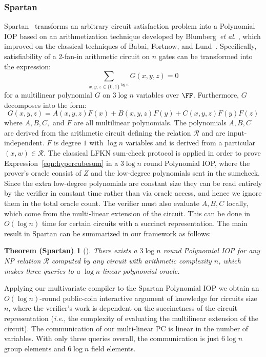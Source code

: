 
\subsubsection{Spartan}
\textsf{Spartan}~\cite{Spartan} transforms an arbitrary circuit satisfaction problem into a Polynomial IOP based on an arithmetization technique developed by Blumberg~\emph{et al.} \cite{EPRINT:BTVW14}, which improved on the classical techniques of Babai, Fortnow, and Lund~\cite{BFL}. Specifically, satisfiability of a 2-fan-in arithmetic circuit on $n$ gates can be transformed into the expression: 
\begin{equation}\label{eqn:hypercubesum}
\sum_{x, y, z \in \{0,1\}^{\log n}} G(x, y, z) = 0
\end{equation} 
for a multilinear polynomial $G$ on $3 \log n$ variables over $\FF$. 
Furthermore, $G$ decomposes into the form: 
$$G(x,y,z) = A(x,y,z) F(x) + B(x, y, z) F(y) + C(x, y, z) F(y) F(z)$$
where $A, B, C,$ and $F$ are all multilinear polynomials. The polynomials $A, B, C$ are derived from the arithmetic circuit defining the relation $\mathcal{R}$ and are input-independent. $F$ is degree $1$ with $\log n$ variables and is derived from a particular $(x, w) \in \mathcal{R}$. The classical LFKN sum-check protocol %
is applied in order to prove Expression~\ref{eqn:hypercubesum} in a $3\log n$ round Polynomial IOP, where the prover's oracle consist of $Z$ and the low-degree polynomials sent in the sumcheck. Since the extra low-degree polynomials are constant size they can be read entirely by the verifier in constant time rather than via oracle access, and hence we ignore them in the total oracle count. The verifier must also evaluate $A, B, C$ locally, which come from the multi-linear extension of the circuit. This can be done in $O(\log n )$ time for certain circuits with a succinct representation. The main result in Spartan can be summarized in our framework as follows: 
\newtheorem*{spartantheorem}{Theorem (Spartan)}
\begin{spartantheorem}[\cite{Spartan}]
There exists a $3 \log n$ round Polynomial IOP for any NP relation $\mathcal{R}$ computed by any circuit with arithmetic complexity $n$, which makes three queries to a $\log n$-linear polynomial oracle. %
\end{spartantheorem}

Applying our multivariate compiler to the \textsf{Spartan} Polynomial IOP we obtain an $O(\log n)$-round public-coin interactive argument of knowledge for circuits size $n$, where the verifier's work is dependent on the succinctness of the circuit representation (\emph{i.e.}, the complexity of evaluating the multilinear extension of the circuit). The communication of our multi-linear PC is linear in the number of variables. With only three queries overall, the communication is just $6 \log n$ group elements and $6 \log n$ field elements. 

